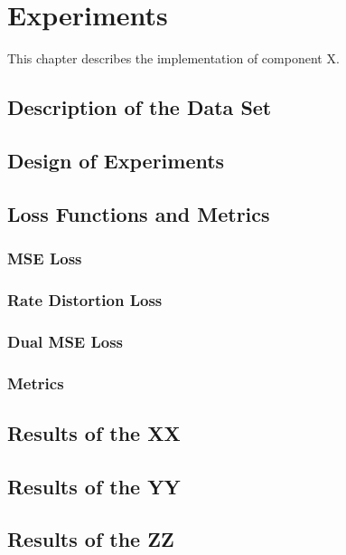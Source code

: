 \chapter{Experiments\label{cha:chapter5}}
This chapter describes the implementation of component X.

\section{Description of the Data Set\label{sec:xx}}

\section{Design of Experiments\label{sec:yy}}

\section{Loss Functions and Metrics}

\subsection{MSE Loss}

\subsection{Rate Distortion Loss}

\subsection{Dual MSE Loss}

\subsection{Metrics}

\section{Results of the XX\label{sec:ch5xx}}

\section{Results of the YY\label{sec:ch5yy}}

\section{Results of the ZZ\label{sec:ch5zz}}